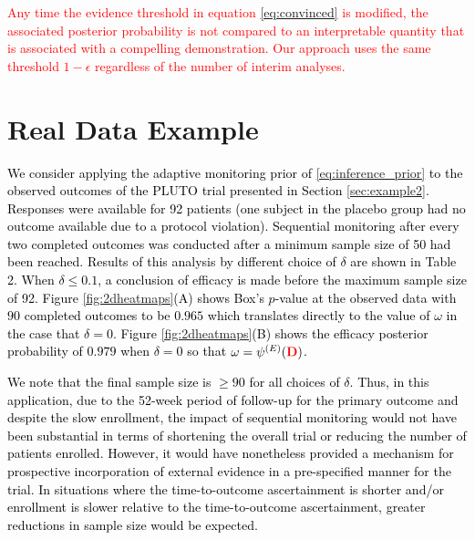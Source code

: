 \documentclass[12pt]{article}
\begin{document}
\textcolor{red}{Any time the evidence threshold in equation \eqref{eq:convinced} is modified, the associated posterior probability is not compared to an interpretable quantity that is associated with a compelling demonstration. Our approach uses the same threshold $1-\epsilon$ regardless of the number of interim analyses.
}
\section{Real Data Example}\label{sec:realdataexample}
\textcolor{black}{
We consider applying the adaptive monitoring prior of \eqref{eq:inference_prior} to the observed outcomes of the PLUTO trial presented in Section \ref{sec:example2}. %
Responses were available for 92 patients (one subject in the placebo group had no outcome available due to a protocol violation). Sequential monitoring after every two completed outcomes was conducted after a minimum sample size of 50 had been reached. Results of this analysis by different choice of $\delta$ are shown in Table 2. When $\delta\leq 0.1$, a conclusion of efficacy is made before the maximum sample size of 92. Figure \ref{fig:2dheatmaps}(A) shows Box's $p$-value at the observed data with $90$ completed outcomes to be $0.965$ which translates directly to the value of $\omega$ in the case that $\delta=0$. Figure \ref{fig:2dheatmaps}(B) shows the efficacy posterior probability of $0.979$ when $\delta=0$ so that $\omega=\psi^{(E)}(\textcolor{red}{\mathbf{D}})$.} 

\textcolor{black}{We note that the final sample size is $\ge 90$ for all choices of $\delta$. Thus, in this application, due to the 52-week period of follow-up for the primary outcome and despite the slow enrollment, the impact of sequential monitoring would not have been substantial in terms of shortening the overall trial or reducing the number of patients enrolled. However, it would have nonetheless provided a mechanism for prospective incorporation of external evidence in a pre-specified manner for the trial. In situations where the time-to-outcome ascertainment is shorter and/or enrollment is slower relative to the time-to-outcome ascertainment, greater reductions in sample size would be expected.}
\end{document}
